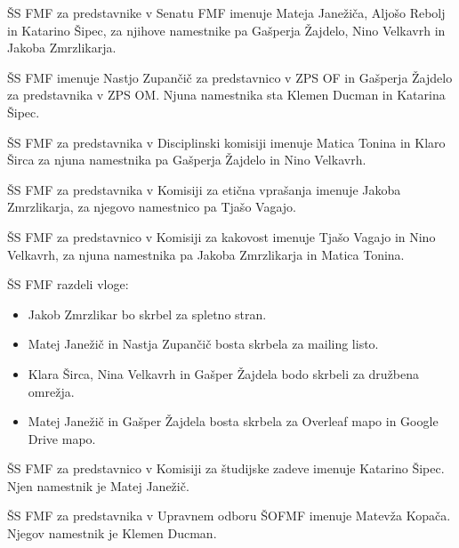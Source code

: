 \documentclass{seja}
\begin{document}
\begin{ad}
	\begin{sklep*}
	ŠS FMF za predstavnike v Senatu FMF imenuje Mateja Janežiča, Aljošo Rebolj in  Katarino Šipec, za njihove namestnike pa Gašperja Žajdelo, Nino Velkavrh in Jakoba Zmrzlikarja.
	\end{sklep*}
	
	\begin{sklep*}
	ŠS FMF imenuje Nastjo Zupančič za predstavnico v ZPS OF in Gašperja Žajdelo za predstavnika v ZPS OM. Njuna namestnika sta Klemen Ducman in Katarina Šipec.
	\end{sklep*}
	
	\begin{sklep*}
	ŠS FMF za predstavnika v Disciplinski komisiji imenuje Matica Tonina in Klaro Širca za njuna namestnika pa Gašperja Žajdelo in Nino Velkavrh.
	\end{sklep*}
	
	\begin{sklep*}
	ŠS FMF za predstavnika v Komisiji za etična vprašanja imenuje Jakoba Zmrzlikarja, za njegovo namestnico pa Tjašo Vagajo.
	\end{sklep*}
	
	\begin{sklep*}
	ŠS FMF za predstavnico v Komisiji za kakovost imenuje Tjašo Vagajo in Nino Velkavrh, za njuna namestnika pa Jakoba Zmrzlikarja in Matica Tonina.
	\end{sklep*}
	
	\begin{sklep*}
	ŠS FMF razdeli vloge:
		\begin{itemize}
			\item 
			Jakob Zmrzlikar bo skrbel za spletno stran.
			\item 
			Matej Janežič in Nastja Zupančič bosta skrbela za mailing listo.
			\item 
			Klara Širca, Nina Velkavrh in Gašper Žajdela bodo skrbeli za družbena omrežja.
			\item 
			Matej Janežič in Gašper Žajdela bosta skrbela za Overleaf mapo in Google Drive mapo.
			\end{itemize}
	\end{sklep*}
	
	\begin{sklep*}
	ŠS FMF za predstavnico v Komisiji za študijske zadeve imenuje Katarino Šipec. Njen namestnik je Matej Janežič.
	\end{sklep*}
	
	\begin{sklep*}
    ŠS FMF za predstavnika v Upravnem odboru ŠOFMF imenuje Matevža Kopača. Njegov namestnik je Klemen Ducman.
    \end{sklep*}
	

\end{ad}
\end{document}
